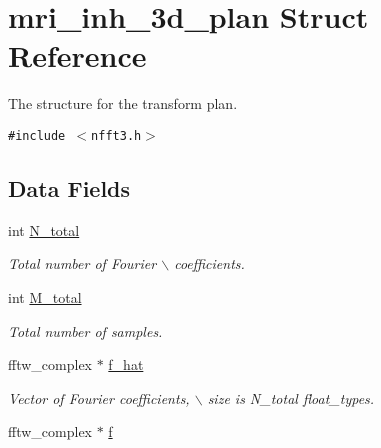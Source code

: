 \hypertarget{structmri__inh__3d__plan}{
\section{mri\_\-inh\_\-3d\_\-plan Struct Reference}
\label{structmri__inh__3d__plan}
}
The structure for the transform plan.  


{\tt \#include $<$nfft3.h$>$}

\subsection*{Data Fields}
\begin{CompactItemize}
\item 
\hypertarget{structmri__inh__3d__plan_a1b253e912e92b252c4992eb86d92e12}{
int \hyperlink{structmri__inh__3d__plan_a1b253e912e92b252c4992eb86d92e12}{N\_\-total}}
\label{structmri__inh__3d__plan_a1b253e912e92b252c4992eb86d92e12}

\begin{CompactList}\small\item\em Total number of Fourier $\backslash$ coefficients. \item\end{CompactList}\item 
\hypertarget{structmri__inh__3d__plan_e90c4e1c541956b5902e7aafc193ad8b}{
int \hyperlink{structmri__inh__3d__plan_e90c4e1c541956b5902e7aafc193ad8b}{M\_\-total}}
\label{structmri__inh__3d__plan_e90c4e1c541956b5902e7aafc193ad8b}

\begin{CompactList}\small\item\em Total number of samples. \item\end{CompactList}\item 
\hypertarget{structmri__inh__3d__plan_91ed30b213dea4954d2d27c4d1334a50}{
fftw\_\-complex $\ast$ \hyperlink{structmri__inh__3d__plan_91ed30b213dea4954d2d27c4d1334a50}{f\_\-hat}}
\label{structmri__inh__3d__plan_91ed30b213dea4954d2d27c4d1334a50}

\begin{CompactList}\small\item\em Vector of Fourier coefficients, $\backslash$ size is N\_\-total float\_\-types. \item\end{CompactList}\item 
\hypertarget{structmri__inh__3d__plan_9e51f5f4ad46d4b120c452fc962a2385}{
fftw\_\-complex $\ast$ \hyperlink{structmri__inh__3d__plan_9e51f5f4ad46d4b120c452fc962a2385}{f}}
\label{structmri__inh__3d__plan_9e51f5f4ad46d4b120c452fc962a2385}


\end{CompactItemize}
